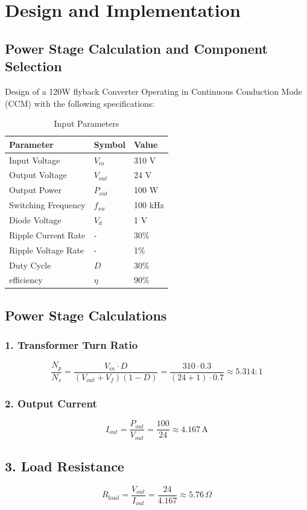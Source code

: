 \section{Design and Implementation}
\subsection{Power Stage Calculation and Component Selection}
Design of a 120W flyback Converter Operating in Continuous Conduction Mode (CCM) with
the following specifications:
\newpage
\begin{table}[h!]
    \centering
    \begin{tabular}{l l l}
        \toprule
        \textbf{Parameter} & \textbf{Symbol} & \textbf{Value} \\
        \midrule
        Input Voltage & $ V_{in} $ & 310 V \\
        Output Voltage & $ V_{out} $ & 24 V \\
        Output Power & $ P_{out} $ & 100 W \\
        Switching Frequency & $ f_{sw} $ & 100 kHz \\
        Diode Voltage & $ V_d $ & 1 V \\
        Ripple Current Rate & - & 30\% \\
        Ripple Voltage Rate & - & 1\% \\
        Duty Cycle & $ D $ & 30\%\\
        efficiency & $ \eta $ & 90\%\\
        \bottomrule
    \end{tabular}
    \caption{Input Parameters}
\end{table}
\subsection{Power Stage Calculations}
\subsubsection*{1. Transformer Turn Ratio}
\[
\frac{N_p}{N_s} = \frac{V_{in} \cdot D}{(V_{out} + V_f)(1 - D)} 
= \frac{310 \cdot 0.3}{(24 + 1) \cdot 0.7} \approx \boxed{5.314:1}
\]
\subsubsection*{2. Output Current}
\[
I_{out} = \frac{P_{out}}{V_{out}} = \frac{100}{24} \approx \boxed{4.167\,\text{A}}
\]
\subsection*{3. Load Resistance}
\[
R_{\text{load}} = \frac{V_{out}}{I_{out}} = \frac{24}{4.167} \approx \boxed{5.76\,\Omega}
\]
